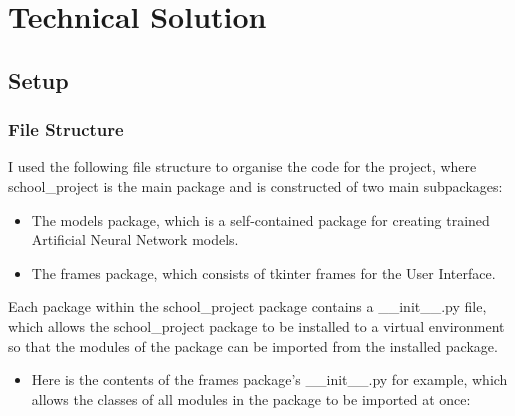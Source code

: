 \documentclass[./project-report/src/latex/project-report.tex]{subfiles}
\begin{document}
\maketitle

\section{Technical Solution}

\subsection{Setup}

\subsubsection{File Structure}

I used the following file structure to organise the code for the project, where school\_project is the main package and is constructed of two main subpackages:

\begin{itemize}
    \item The models package, which is a self-contained package for creating trained Artificial Neural Network models.
    \item The frames package, which consists of tkinter frames for the User Interface.
\end{itemize}

\pagebreak

\begin{footnotesize}

\end{footnotesize}

\pagebreak

Each package within the school\_project package contains a \_\_init\_\_.py file, which allows the school\_project package to be installed to a virtual environment 
so that the modules of the package can be imported from the installed package.

\begin{itemize}
    \item Here is the contents of the frames package's \_\_init\_\_.py for example, which allows the classes of all modules in the package to be imported at once:
        \inputminted{python}{./school_project/frames/__init__.py}
\end{itemize}
\end{document}
